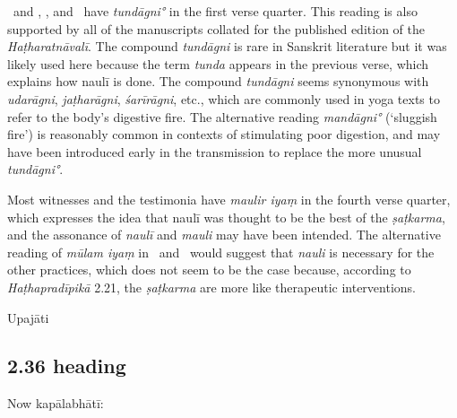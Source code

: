 \begin{ekdosis}
\begin{testimonia}[hp02_035]
\end{testimonia}

\begin{philcomm}[hp02_035]
\alphaOne\ and \alphaTwo, \betaTwo, and \epsilonOne\ have \emph{tundāgni°} in the first verse quarter. This reading is also supported by all of the manuscripts collated for the published edition of the \emph{Haṭharatnāvalī}. The compound \emph{tundāgni} is rare in Sanskrit literature but it was likely used here because the term \emph{tunda} appears in the previous verse, which explains how naulī is done. The compound \emph{tundāgni} seems synonymous with \emph{udarāgni}, \emph{jaṭharāgni}, \emph{śarīrāgni}, etc., which are commonly used in yoga texts to refer to the body's digestive fire. The alternative reading \emph{mandāgni°} (`sluggish fire') is reasonably common in contexts of stimulating poor digestion, and may have been introduced early in the transmission to replace the more unusual \emph{tundāgni°}. 


Most witnesses and the testimonia have \emph{maulir iyaṃ} in the fourth verse quarter, which expresses the idea that naulī was thought to be the best of the \emph{ṣaṭkarma}, and the assonance of \emph{naulī} and \emph{mauli} may have been intended. The alternative reading of \emph{mūlam iyaṃ} in \etaOne\ and \epsilonOne\ would suggest that \emph{nauli} is necessary for the other practices, which does not seem to be the case because, according to \emph{Haṭhapradīpikā} 2.21, the \emph{ṣaṭkarma} are more like therapeutic interventions.
\end{philcomm}

\begin{metre}[hp02_035]
Upajāti
\end{metre}

\subsection*{2.36 heading}
\begin{translation}[hp02_036a]
Now kapālabhātī:
\end{translation}



\end{ekdosis}
